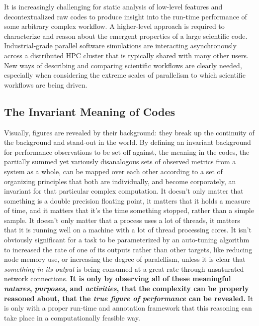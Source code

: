 It is increasingly challenging for static analysis of low-level
features and decontextualized raw codes to produce insight into the
run-time performance of some arbitrary complex workflow.
%
A higher-level approach is required to characterize and reason about
the emergent properties of a large scientific code.
%
Industrial-grade parallel software simulations are interacting
asynchronously across a distributed HPC cluster that is typically
shared with many other users.
%
New ways of describing and comparing scientific workflows are clearly
needed, especially when considering the extreme scales of parallelism
to which scientific workflows are being driven.



\subsection{The Invariant Meaning of Codes}

Visually, figures are revealed by their background: they break up the
continuity of the background and stand-out in the world.
%
By defining an invariant background for performance observations to be
set off against, the meaning in the codes, the partially summed yet
variously disanalogous sets of observed metrics from a system as a
whole, can be mapped over each other according to a set of organizing
principles that both are individually, and become corporately, an
invariant for that particular complex computation.
%
It doesn't only matter that something is a double precision floating
point, it matters that it holds a measure of time, and it matters that
it's the time something stopped, rather than a simple sample.
%
It doesn't only matter that a process uses a lot of threads, it
matters that it is running well on a machine with a lot of thread
processing cores.
%
It isn't obviously significant for a task to be parameterized by an
auto-tuning algorithm to increased the rate of one of its outputs
rather than other targets, like reducing node memory use, or
increasing the degree of paralellism, unless it is clear that
\textit{something in its output} is being consumed at a great rate
through unsaturated network connections.
%
\textbf{It is only by observing all of these meaningful
  \textit{natures}, \textit{purposes}, and \textit{activities}, that
  the complexity can be properly reasoned about, that the \textit{true
    figure of performance} can be revealed.}
%
It is only with a proper run-time and annotation framework that this
reasoning can take place in a computationally feasible way.

